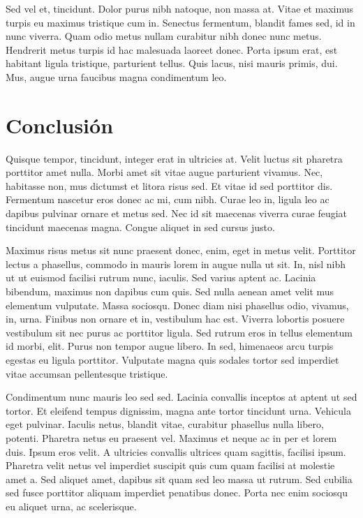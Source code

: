 \documentclass[spanish,]{article}
\begin{document}
Sed vel et, tincidunt. Dolor purus nibh natoque, non massa at. Vitae et maximus turpis eu maximus tristique cum in. Senectus fermentum, blandit fames sed, id in nunc viverra. Quam odio metus nullam curabitur nibh donec nunc metus. Hendrerit metus turpis id hac malesuada laoreet donec. Porta ipsum erat, est habitant ligula tristique, parturient tellus. Quis lacus, nisi mauris primis, dui. Mus, augue urna faucibus magna condimentum leo.

\hypertarget{conclusiuxf3n}{%
\section{Conclusión}\label{conclusiuxf3n}}

Quisque tempor, tincidunt, integer erat in ultricies at. Velit luctus sit pharetra porttitor amet nulla. Morbi amet sit vitae augue parturient vivamus. Nec, habitasse non, mus dictumst et litora risus sed. Et vitae id sed porttitor dis. Fermentum nascetur eros donec ac mi, cum nibh. Curae leo in, ligula leo ac dapibus pulvinar ornare et metus sed. Nec id sit maecenas viverra curae feugiat tincidunt maecenas magna. Congue aliquet in sed cursus justo.

Maximus risus metus sit nunc praesent donec, enim, eget in metus velit. Porttitor lectus a phasellus, commodo in mauris lorem in augue nulla ut sit. In, nisl nibh ut ut euismod facilisi rutrum nunc, iaculis. Sed varius aptent ac. Lacinia bibendum, maximus non dapibus cum quis. Sed nulla aenean amet velit mus elementum vulputate. Massa sociosqu. Donec diam nisi phasellus odio, vivamus, in, urna. Finibus non ornare et in, vestibulum hac est. Viverra lobortis posuere vestibulum sit nec purus ac porttitor ligula. Sed rutrum eros in tellus elementum id morbi, elit. Purus non tempor augue libero. In sed, himenaeos arcu turpis egestas eu ligula porttitor. Vulputate magna quis sodales tortor sed imperdiet vitae accumsan pellentesque tristique.

Condimentum nunc mauris leo sed sed. Lacinia convallis inceptos at aptent ut sed tortor. Et eleifend tempus dignissim, magna ante tortor tincidunt urna. Vehicula eget pulvinar. Iaculis netus, blandit vitae, curabitur phasellus nulla libero, potenti. Pharetra netus eu praesent vel. Maximus et neque ac in per et lorem duis. Ipsum eros velit. A ultricies convallis ultrices quam sagittis, facilisi ipsum. Pharetra velit netus vel imperdiet suscipit quis cum quam facilisi at molestie amet a. Sed aliquet amet, dapibus sit quam sed leo massa ut rutrum. Sed cubilia sed fusce porttitor aliquam imperdiet penatibus donec. Porta nec enim sociosqu eu aliquet urna, ac scelerisque.
\end{document}
